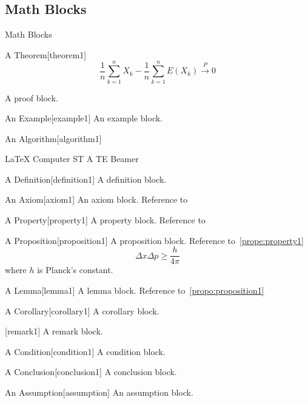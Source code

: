 \documentclass[hyperref, UTF8, CJK, aspectratio=169]{beamer}
\begin{document}
\subsection{Math Blocks}
\begin{frame}{Math Blocks}
	\begin{bittheorem}{A Theorem}[theorem1]
		\begin{equation}
		\dfrac{1}{n} \sum_{k=1}^{n} X_k - \dfrac{1}{n} \sum_{k=1}^{n} E(X_k) \stackrel{\;P\;}{\longrightarrow} 0
		\end{equation}
	\end{bittheorem}
	\begin{bitproof}{}
		A proof block.
	\end{bitproof}
	\begin{bitexample}{An Example}[example1]
		An example block.
	\end{bitexample}
	\begin{bitalgorithm}{An Algorithm}[algorithm1]
		\begin{algorithmic}[1]
			\REQUIRE \LaTeX{}
			\ENSURE Computer
			\STATE ST
			\STATE A
			\STATE TE
			\RETURN Beamer
		\end{algorithmic}
	\end{bitalgorithm}
	\begin{bitdefinition}{A Definition}[definition1]
		A definition block.
	\end{bitdefinition}
	\begin{bitaxiom}{An Axiom}[axiom1]
		An axiom block. Reference to~
	\end{bitaxiom}
	\begin{bitproperty}{A Property}[property1]
		A property block. Reference to~
	\end{bitproperty}
	\begin{bitproposition}{A Proposition}[proposition1]
		A proposition block. Reference to~\vref{prope:property1}
		\begin{equation}
		\Delta x \Delta p \geq \dfrac{h}{4\pi}
		\end{equation}
		where $h$ is Planck's constant.
	\end{bitproposition}
	\begin{bitlemma}{A Lemma}[lemma1]
		A lemma block. Reference to~\cref{propo:proposition1}
	\end{bitlemma}
	\begin{bitcorollary}{A Corollary}[corollary1]
		A corollary block.
	\end{bitcorollary}
	\begin{bitremark}{}[remark1]
		A remark block.
	\end{bitremark}
	\begin{bitcondition}{A Condition}[condition1]
		A condition block.
	\end{bitcondition}
	\begin{bitconclusion}{A Conclusion}[conclusion1]
		A conclusion block.
	\end{bitconclusion}
	\begin{bitassumption}{An Assumption}[assumption]
		An assumption block.
	\end{bitassumption}
\end{frame}
\end{document}

